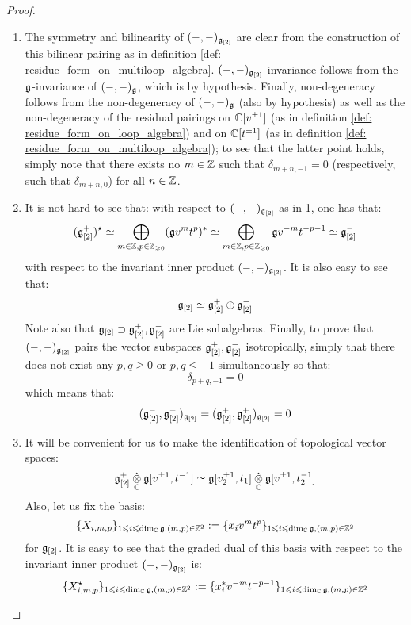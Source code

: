             \begin{proof}
                \begin{enumerate}
                    \item The symmetry and bilinearity of $(-, -)_{\mathfrak{g}_{[2]}}$ are clear from the construction of this bilinear pairing as in definition \ref{def: residue_form_on_multiloop_algebra}. $(-, -)_{\mathfrak{g}_{[2]}}$-invariance follows from the $\mathfrak{g}$-invariance of $(-, -)_{\mathfrak{g}}$, which is by hypothesis. Finally, non-degeneracy follows from the non-degeneracy of $(-, -)_{\mathfrak{g}}$ (also by hypothesis) as well as the non-degeneracy of the residual pairings on $\mathbb{C}[v^{\pm 1}]$ (as in definition \ref{def: residue_form_on_loop_algebra}) and on $\mathbb{C}[t^{\pm 1}]$ (as in definition \ref{def: residue_form_on_multiloop_algebra}); to see that the latter point holds, simply note that there exists no $m \in \mathbb{Z}$ such that $\delta_{m + n, - 1} = 0$ (respectively, such that $\delta_{m + n, 0}$) for all $n \in \mathbb{Z}$.
                    \item It is not hard to see that: with respect to $(-, -)_{\mathfrak{g}_{[2]}}$ as in 1, one has that:
                        $$(\mathfrak{g}_{[2]}^+)^{\star} \simeq \bigoplus_{m \in \mathbb{Z}, p \in \mathbb{Z}_{\geqslant 0}} (\mathfrak{g} v^m t^p)^* \simeq \bigoplus_{m \in \mathbb{Z}, p \in \mathbb{Z}_{\geqslant 0}} \mathfrak{g} v^{-m} t^{-p - 1} \simeq \mathfrak{g}_{[2]}^-$$
                    with respect to the invariant inner product $(-, -)_{\mathfrak{g}_{[2]}}$. It is also easy to see that:
                        $$\mathfrak{g}_{[2]} \simeq \mathfrak{g}_{[2]}^+ \oplus \mathfrak{g}_{[2]}^-$$
                    Note also that $\mathfrak{g}_{[2]} \supset \mathfrak{g}_{[2]}^+, \mathfrak{g}_{[2]}^-$ are Lie subalgebras. Finally, to prove that $(-, -)_{\mathfrak{g}_{[2]}}$ pairs the vector subspaces $\mathfrak{g}_{[2]}^+, \mathfrak{g}_{[2]}^-$ isotropically, simply that there does not exist any $p, q \geq 0$ or $p, q \leq -1$ simultaneously so that:
                        $$\delta_{p + q, -1} = 0$$
                    which means that:
                        $$(\mathfrak{g}_{[2]}^-, \mathfrak{g}_{[2]}^-)_{\mathfrak{g}_{[2]}} = (\mathfrak{g}_{[2]}^+, \mathfrak{g}_{[2]}^+)_{\mathfrak{g}_{[2]}} = 0$$
                    \item It will be convenient for us to make the identification of topological vector spaces:
                        $$\g_{[2]}^+ \hattensor_{\bbC} \g[v^{\pm 1}, t^{-1}] \cong \g[v_2^{\pm 1}, t_1] \hattensor_{\bbC} \g[v^{\pm 1}, t_2^{-1}]$$
                    Also, let us fix the basis:
                        $$\{X_{i, m, p}\}_{1 \leqslant i \leqslant \dim_{\mathbb{C}} \mathfrak{g}, (m, p) \in \mathbb{Z}^2} := \{x_i v^m t^p\}_{1 \leqslant i \leqslant \dim_{\mathbb{C}} \mathfrak{g}, (m, p) \in \mathbb{Z}^2}$$
                    for $\mathfrak{g}_{[2]}$. It is easy to see that the graded dual of this basis with respect to the invariant inner product $(-, -)_{\mathfrak{g}_{[2]}}$ is:
                        $$\{X_{i, m, p}^{\star}\}_{1 \leqslant i \leqslant \dim_{\mathbb{C}} \mathfrak{g}, (m, p) \in \mathbb{Z}^2} := \{x_i^* v^{-m} t^{-p - 1}\}_{1 \leqslant i \leqslant \dim_{\mathbb{C}} \mathfrak{g}, (m, p) \in \mathbb{Z}^2}$$
                    

\end{enumerate}
\end{proof}
